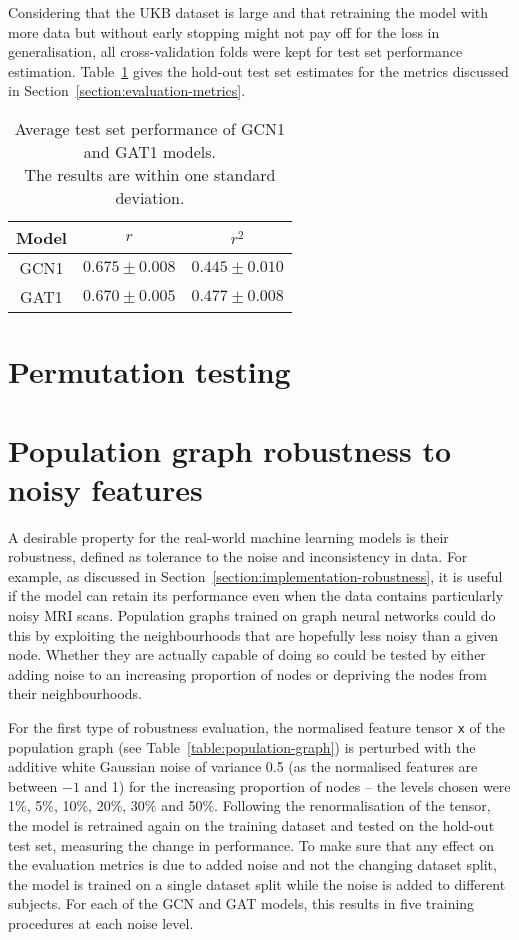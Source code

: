 Considering that the UKB dataset is large and that retraining the model with more data but without early stopping might not pay off for the loss in generalisation, all cross-validation folds were kept for test set performance estimation. Table~\ref{table:test-performance} gives the hold-out test set estimates for the metrics discussed in Section~\ref{section:evaluation-metrics}.

\begin{table}[h]
    \caption{Average test set performance of GCN1 and GAT1 models. \\ The results are within one standard deviation.}\label{table:test-performance}
    \centering
    \small
    \begin{tabular}{ccc}
        \hline
    \textbf{Model} & $r$ & $r^2$ \\  \hline
        GCN1 & $0.675 \pm 0.008$ & $0.445 \pm 0.010$ \\
        GAT1 & $0.670 \pm 0.005$ & $0.477 \pm 0.008$ \\ \hline
\end{tabular}
\end{table}


\section{Permutation testing}

\section{Population graph robustness to noisy features}
A desirable property for the real-world machine learning models is their robustness, defined as tolerance to the noise and inconsistency in data.
For example, as discussed in Section~\ref{section:implementation-robustness}, it is useful if the model can retain its performance even when the data contains particularly noisy MRI scans. Population graphs trained on graph neural networks could do this by exploiting the neighbourhoods that are hopefully less noisy than a given node. Whether they are actually capable of doing so could be tested by either adding noise to an increasing proportion of nodes or depriving the nodes from their neighbourhoods. 

For the first type of robustness evaluation, the normalised feature tensor \texttt{x} of the population graph (see Table~\ref{table:population-graph}) is perturbed with the additive white Gaussian noise of variance 0.5 (as the normalised features are between $-1$ and 1) for the increasing proportion of nodes – the levels chosen were 1\%, 5\%, 10\%, 20\%, 30\% and 50\%. Following the renormalisation of the tensor, the model is retrained again on the training dataset and tested on the hold-out test set, measuring the change in performance. To make sure that any effect on the evaluation metrics is due to added noise and not the changing dataset split, the model is trained on a single dataset split while the noise is added to different subjects. For each of the GCN and GAT models, this results in five training procedures at each noise level.


